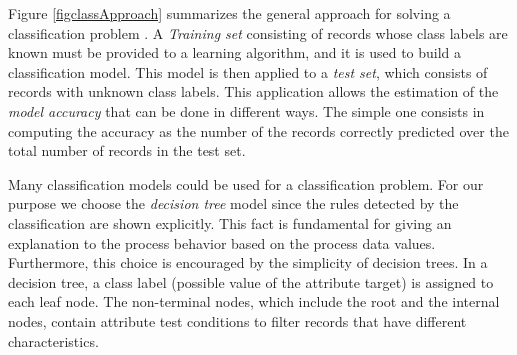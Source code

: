 \documentclass{llncs}
\begin{document}
Figure \ref{figclassApproach} summarizes the general approach for solving a classification problem \cite{5}. A \emph{Training set} consisting of records whose class labels are known must be provided to a learning algorithm, and it is used to build a classification model. This model is then applied to a \emph{test set}, which consists of records with unknown class labels. This application allows the estimation of the \emph{model accuracy} that can be done in different ways. The simple one consists in computing the accuracy as the number of the records correctly predicted over the total number of records in the test set.

Many classification models could be used for a classification problem. For our purpose we choose the \emph{decision tree} model since the rules detected by the classification are shown explicitly. This fact is fundamental for giving an explanation to the process behavior based on the process data values. Furthermore, this choice is encouraged by the simplicity of decision trees. In a decision tree, a class label (possible value of the attribute target) is assigned to each leaf node. The non-terminal nodes, which include the root and the internal nodes, contain attribute test conditions to filter records that have different characteristics.

\end{document}
